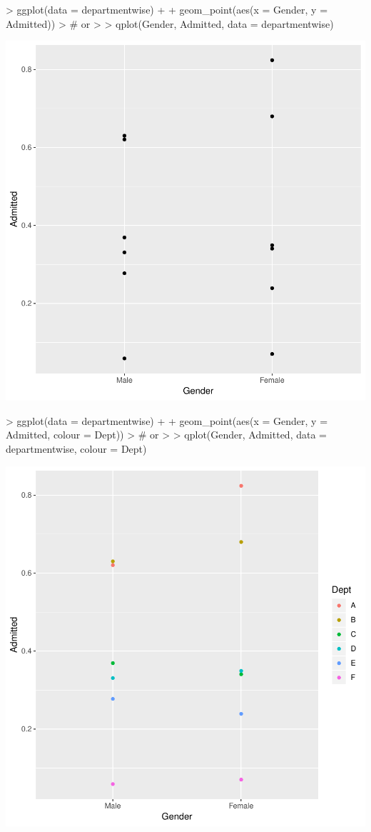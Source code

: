 \documentclass[12pt,letterpaper,final]{article}
\begin{document}
\begin{Schunk}
\begin{Sinput}
> ggplot(data = departmentwise) +
+   geom_point(aes(x = Gender, y = Admitted))
> # or
> 
> qplot(Gender, Admitted, data = departmentwise)
\end{Sinput}
\end{Schunk}
\includegraphics{lect_main-029}

\begin{Schunk}
\begin{Sinput}
> ggplot(data = departmentwise) +
+   geom_point(aes(x = Gender, y = Admitted, colour = Dept))
> # or
> 
> qplot(Gender, Admitted, data = departmentwise, colour = Dept)
\end{Sinput}
\end{Schunk}
\includegraphics{lect_main-030}
\end{document}
